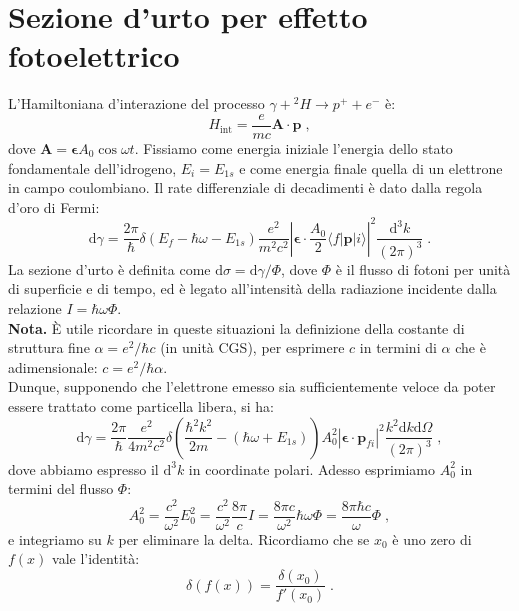 \documentclass[12pt,a4paper]{report}
\theoremstyle{definition}
\numberwithin{equation}{section}
\newcommand{\diff}[1][]{\mathrm{d}#1}
\newcommand{\bra}{\langle}
\newcommand{\ket}{\rangle}
\begin{document}
\section{Sezione d'urto per effetto fotoelettrico}
L'Hamiltoniana d'interazione del processo $\gamma+{}^2H\rightarrow p^+ +e^-$ è:
\begin{equation}
H_{\mathrm{int}}=\frac{e}{mc}\mathbf{A}\cdot\mathbf{p}\;,
\end{equation}
dove $\mathbf{A}=\boldsymbol{\epsilon}A_0\cos\omega t$. Fissiamo come energia iniziale l'energia dello stato fondamentale dell'idrogeno, $E_i=E_{1s}$ e come energia finale quella di un elettrone in campo coulombiano. Il rate differenziale di decadimenti è dato dalla regola d'oro di Fermi:
\begin{equation}
\diff{\gamma}=\frac{2\pi}{\hbar}\delta(E_f-\hbar\omega-E_{1s})\frac{e^2}{m^2c^2}\left|\boldsymbol{\epsilon}\cdot\frac{A_0}{2}\bra f|\mathbf{p}|i\ket\right|^2\frac{\diff^3{k}}{(2\pi)^3}\;.
\end{equation}
La sezione d'urto è definita come $\diff{\sigma}=\diff{\gamma}/\Phi$, dove $\Phi$ è il flusso di fotoni per unità di superficie e di tempo, ed è legato all'intensità della radiazione incidente dalla relazione $I=\hbar\omega \Phi$. \\
\textbf{Nota.} È utile ricordare in queste situazioni la definizione della costante di struttura fine $\alpha=e^2/\hbar c$ (in unità CGS), per esprimere $c$ in termini di $\alpha$ che è adimensionale: $c=e^2/\hbar\alpha$. \\
Dunque, supponendo che l'elettrone emesso sia sufficientemente veloce da poter essere trattato come particella libera, si ha:
\begin{equation}
\diff{\gamma}=\frac{2\pi}{\hbar}\frac{e^2}{4m^2c^2}\delta\left(\frac{\hbar^2k^2}{2m}-(\hbar\omega+E_{1s})\right)A_0^2|\boldsymbol{\epsilon}\cdot\mathbf{p}_{fi}|^2\frac{k^2\diff{k}\diff{\Omega}}{(2\pi)^3}\;,
\end{equation}
dove abbiamo espresso il $\diff^3{k}$ in coordinate polari. Adesso esprimiamo $A_0^2$ in termini del flusso $\Phi$:
\begin{equation}
A_0^2=\frac{c^2}{\omega^2}E_0^2=\frac{c^2}{\omega^2}\frac{8\pi}{c}I=\frac{8\pi c}{\omega^2}\hbar\omega\Phi=\frac{8\pi\hbar c}{\omega}\Phi\;,
\end{equation}
e integriamo su $k$ per eliminare la delta. Ricordiamo che se $x_0$ è uno zero di $f(x)$ vale l'identità:
\begin{equation}
\delta(f(x))=\frac{\delta(x_0)}{f'(x_0)}\;.
\end{equation}
\end{document}
